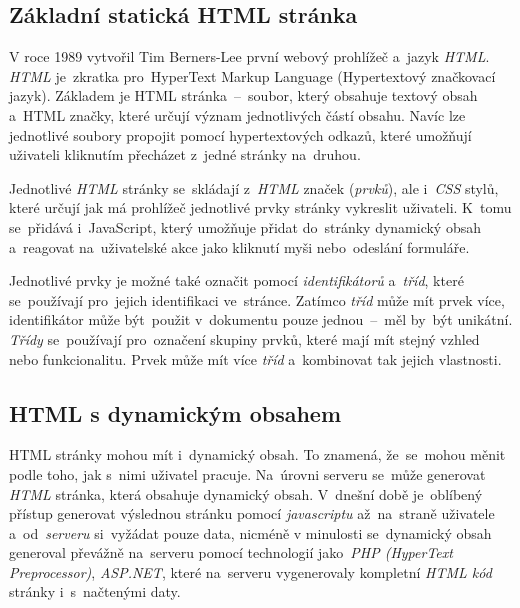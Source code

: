\documentclass[10pt,a4paper]{article}
\begin{document}
        \cite{itnetworkBestPractices}

        \subsection{Základní statická HTML stránka}
            V roce 1989 vytvořil Tim Berners-Lee první webový prohlížeč a~jazyk \emph{HTML}. \emph{HTML} je~zkratka pro~HyperText Markup Language (Hypertextový značkovací jazyk). Základem je HTML stránka~--~soubor, který obsahuje textový obsah a~HTML značky, které určují význam jednotlivých částí obsahu. Navíc lze jednotlivé soubory propojit pomocí hypertextových odkazů, které umožňují uživateli kliknutím přecházet z~jedné stránky na~druhou.

            Jednotlivé \emph{HTML} stránky se~skládají z~\emph{HTML} značek (\emph{prvků}), ale i~\emph{CSS} stylů, které určují jak má prohlížeč jednotlivé prvky stránky vykreslit uživateli. K~tomu se~přidává i~JavaScript, který umožňuje přidat do~stránky dynamický obsah a~reagovat na~uživatelské akce jako kliknutí myši nebo~odeslání formuláře. \cite{berners:1989:proposal}

            Jednotlivé prvky je možné také označit pomocí \emph{identifikátorů} a~\emph{tříd}, které se~používají pro~jejich identifikaci ve~stránce. Zatímco \emph{tříd} může mít prvek více, identifikátor může být~použit v~dokumentu pouze jednou~--~měl by~být unikátní. \emph{Třídy} se~používají pro~označení skupiny prvků, které mají mít stejný vzhled nebo funkcionalitu. Prvek může mít více \emph{tříd} a~kombinovat tak jejich vlastnosti. \cite{jpw:tridy}

        \subsection{HTML s dynamickým obsahem}
            HTML stránky mohou mít i~dynamický obsah. To znamená, že~se~mohou měnit podle toho, jak s~nimi uživatel pracuje. Na~úrovni serveru se~může generovat \emph{HTML} stránka, která obsahuje dynamický obsah. V~dnešní době je~oblíbený přístup generovat výslednou stránku pomocí \emph{javascriptu} až~na~straně uživatele a~od~\emph{serveru} si~vyžádat pouze data, nicméně v minulosti se~dynamický obsah generoval převážně na~serveru pomocí technologií jako~\emph{PHP (HyperText Preprocessor)}, \emph{ASP.NET}, které na~serveru vygenerovaly kompletní \emph{HTML kód} stránky i~s~načtenými daty.
\end{document}
